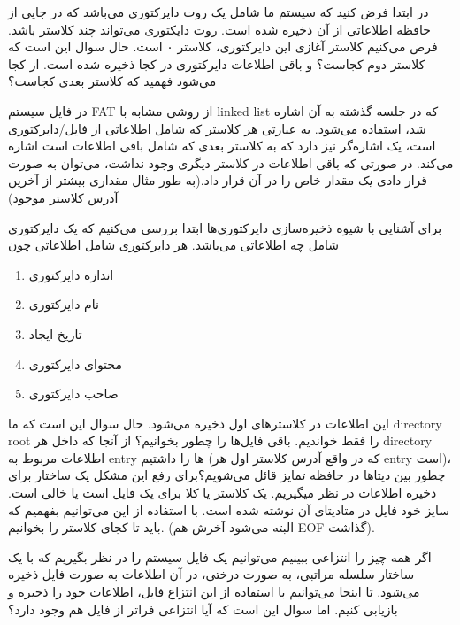 \begin{flushright}
    در ابتدا فرض کنید که سیستم ما شامل یک روت دایرکتوری می‌باشد که در جایی از حافظه اطلاعاتی از آن ذخیره شده است.
    روت دایکتوری می‌تواند چند کلاستر باشد.
    فرض می‌کنیم کلاستر آغازی این دایرکتوری، کلاستر ۰ است.
    حال سوال این است که کلاستر دوم کجاست؟ و باقی اطلاعات دایرکتوری در کجا ذخیره شده است.
    از کجا می‌شود فهمید که کلاستر بعدی کجاست؟


    در فایل سیستم FAT از روشی مشابه با linked list که در جلسه گذشته به آن اشاره شد، استفاده می‌شود.
    به عبارتی هر کلاستر که شامل اطلاعاتی از فایل/دایرکتوری است، یک اشاره‌گر نیز دارد که به کلاستر بعدی که شامل باقی اطلاعات است اشاره می‌کند.
    در صورتی که باقی اطلاعات در کلاستر دیگری وجود نداشت، می‌توان به صورت قرار دادی یک مقدار خاص را در آن قرار داد.(به طور مثال مقداری بیشتر از آخرین آدرس کلاستر موجود)


    برای آشنایی با شیوه ذخیره‌سازی دایرکتوری‌ها ابتدا بررسی می‌کنیم که یک دایرکتوری شامل چه اطلاعاتی می‌باشد.
    هر دایرکتوری شامل اطلاعاتی چون
    \begin{enumerate}
        \item اندازه دایرکتوری
        \item نام دایرکتوری
        \item تاریخ ایجاد
        \item محتوای دایرکتوری
        \item صاحب دایرکتوری
    \end{enumerate}
    این اطلاعات در کلاستر‌های اول ذخیره می‌شود.
    حال سوال این است که ما directory root را فقط خواندیم.
    باقی فایل‌ها را چطور بخوانیم؟ از آنجا که داخل هر directory اطلاعات مربوط به entry ها را داشتیم (که در واقع آدرس کلاستر اول هر entry است)،
    چطور بین دیتاها در حافظه تمایز قائل می‌شویم؟برای رفع این مشکل یک ساختار برای ذخیره اطلاعات در نظر میگیریم.
    یک کلاستر یا کلا برای یک فایل است یا خالی است.
    سایز خود فایل در متادیتای آن نوشته شده است.
    با استفاده از این می‌توانیم بفهمیم که باید تا کجای کلاستر را بخوانیم. (البته می‌شود آخرش هم EOF گذاشت).

     اگر همه چیز را انتزاعی ببینیم می‌توانیم یک فایل سیستم را در نظر بگیریم که با یک ساختار سلسله مراتبی، به صورت درختی، در آن اطلاعات به صورت فایل ذخیره می‌شود.
     تا اینجا می‌توانیم با استفاده از این انتزاع فایل، اطلاعات خود را ذخیره و بازیابی کنیم.
     اما سوال این است که آیا انتزاعی فراتر از فایل هم وجود دارد؟

\end{flushright}